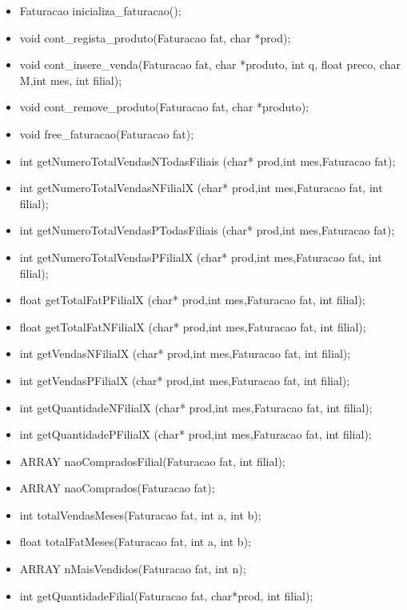 \begin{itemize}

\item	Faturacao inicializa\_faturacao();
\item	void cont\_regista\_produto(Faturacao fat, char *prod);
\item	void cont\_insere\_venda(Faturacao fat, char *produto, int q, float preco, char M,int mes, int filial);
\item	void cont\_remove\_produto(Faturacao fat, char *produto);
\item	void free\_faturacao(Faturacao fat);
\item	int getNumeroTotalVendasNTodasFiliais (char* prod,int mes,Faturacao fat);
\item	int getNumeroTotalVendasNFilialX (char* prod,int mes,Faturacao fat, int filial);
\item	int getNumeroTotalVendasPTodasFiliais (char* prod,int mes,Faturacao fat);
\item	int getNumeroTotalVendasPFilialX (char* prod,int mes,Faturacao fat, int filial);
\item	float getTotalFatPFilialX (char* prod,int mes,Faturacao fat, int filial);
\item	float getTotalFatNFilialX (char* prod,int mes,Faturacao fat, int filial);
\item	int getVendasNFilialX (char* prod,int mes,Faturacao fat, int filial);
\item	int getVendasPFilialX (char* prod,int mes,Faturacao fat, int filial);
\item	int getQuantidadeNFilialX (char* prod,int mes,Faturacao fat, int filial);
\item	int getQuantidadePFilialX (char* prod,int mes,Faturacao fat, int filial);
\item	ARRAY naoCompradosFilial(Faturacao fat, int filial);
\item	ARRAY naoComprados(Faturacao fat);
\item	int totalVendasMeses(Faturacao fat, int a, int b);
\item	float totalFatMeses(Faturacao fat, int a, int b);
\item	ARRAY nMaisVendidos(Faturacao fat, int n);
\item	int getQuantidadeFilial(Faturacao fat, char*prod, int filial);
	
\end{itemize}